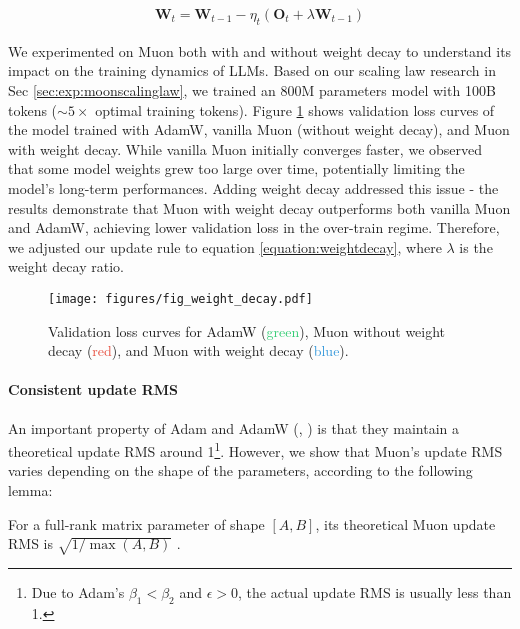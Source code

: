 \begin{align}
\label{equation:weightdecay}
    \mathbf{W}_t = \mathbf{W}_{t-1} - \eta_t (\mathbf{O}_t + \lambda \mathbf{W}_{t-1})
\end{align}

We experimented on Muon both with and without weight decay to understand its impact on the training dynamics of LLMs. Based on our scaling law research in Sec \ref{sec:exp:moonscalinglaw}, we trained an 800M parameters model with 100B tokens ($\sim5\times$ optimal training tokens). Figure \ref{fig_weight_decay} shows validation loss curves of the model trained with AdamW, vanilla Muon (without weight decay), and Muon with weight decay. While vanilla Muon initially converges faster, we observed that some model weights grew too large over time, potentially limiting the model's long-term performances. Adding weight decay addressed this issue - the results demonstrate that Muon with weight decay outperforms both vanilla Muon and AdamW, achieving lower validation loss in the over-train regime. Therefore, we adjusted our update rule to equation \ref{equation:weightdecay}, where $\lambda$ is the weight decay ratio.


\begin{figure}[t]
    \centering
    \texttt{[image: figures/fig\_weight\_decay.pdf]}
    \caption{\small Validation loss curves for AdamW (\textcolor[HTML]{2ecc71}{green}), Muon without weight decay (\textcolor[HTML]{e74c3c}{red}), and Muon with weight decay (\textcolor[HTML]{3498db}{blue}).} 
    \label{fig_weight_decay} 
\end{figure}



\paragraph{Consistent update RMS}
An important property of Adam and AdamW (\cite{adam2015kingma}, \cite{loshchilov2018decoupled}) is that they maintain a theoretical update RMS around 1\footnote{Due to Adam's $\beta_1 < \beta_2$ and $\epsilon > 0$, the actual update RMS is usually less than 1.}. However, we show that Muon's update RMS varies depending on the shape of the parameters, according to the following lemma:

\begin{lemma}
\label{lemma:updaterms}
For a full-rank matrix parameter of shape $[A, B]$, its theoretical Muon update RMS is $\sqrt{1/\max(A,B)}$ .
\end{lemma}

